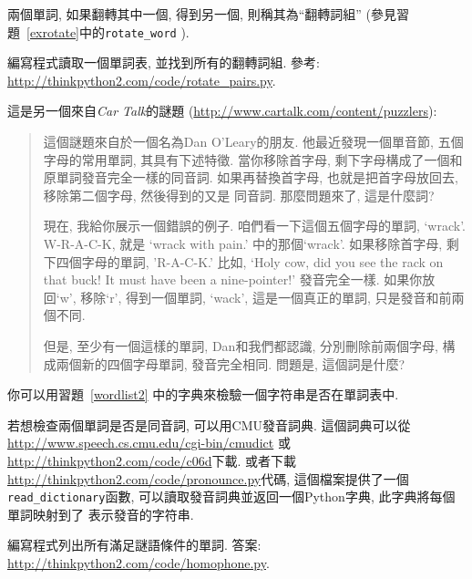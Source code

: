 \documentclass[10pt]{book}
\begin{document}
\begin{exercise}
\label{exrotatepairs}

兩個單詞, 如果翻轉其中一個, 得到另一個, 則稱其為``翻轉詞組''
(參見習題~\ref{exrotate}中的\verb"rotate_word" ).

編寫程式讀取一個單詞表, 並找到所有的翻轉詞組. 
參考: \url{http://thinkpython2.com/code/rotate_pairs.py}.

\end{exercise}


\begin{exercise}

這是另一個來自{\em Car Talk}的謎題
(\url{http://www.cartalk.com/content/puzzlers}):

\begin{quote}
這個謎題來自於一個名為Dan O'Leary的朋友. 
他最近發現一個單音節, 五個字母的常用單詞, 其具有下述特徵. 
當你移除首字母, 剩下字母構成了一個和原單詞發音完全一樣的同音詞. 
如果再替換首字母, 也就是把首字母放回去, 移除第二個字母, 然後得到的又是
同音詞. 那麼問題來了, 這是什麼詞?

現在, 我給你展示一個錯誤的例子. 
咱們看一下這個五個字母的單詞, `wrack'.  W-R-A-C-K, 就是
`wrack with pain.' 中的那個`wrack'. 
如果移除首字母, 剩下四個字母的單詞, 'R-A-C-K.' 
比如, `Holy cow, did you see the rack on that buck!
It must have been a nine-pointer!' 發音完全一樣. 
如果你放回`w', 移除`r', 得到一個單詞, `wack', 
這是一個真正的單詞, 只是發音和前兩個不同. 

但是, 至少有一個這樣的單詞, Dan和我們都認識, 
分別刪除前兩個字母, 構成兩個新的四個字母單詞, 發音完全相同. 
問題是, 這個詞是什麼?
\end{quote}

你可以用習題~\ref{wordlist2} 中的字典來檢驗一個字符串是否在單詞表中. 

若想檢查兩個單詞是否是同音詞, 可以用CMU發音詞典. 
這個詞典可以從\url{http://www.speech.cs.cmu.edu/cgi-bin/cmudict}
或\url{http://thinkpython2.com/code/c06d}下載. 
或者下載\url{http://thinkpython2.com/code/pronounce.py}代碼, 
這個檔案提供了一個 \verb"read_dictionary"函數, 
可以讀取發音詞典並返回一個Python字典, 此字典將每個單詞映射到了
表示發音的字符串. 

編寫程式列出所有滿足謎語條件的單詞. 
答案: \url{http://thinkpython2.com/code/homophone.py}.

\end{exercise}
\end{document}
